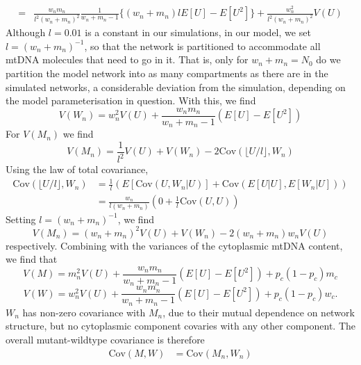 \documentclass{article}
\begin{document}
\begin{appendices}
{\begin{equation*}
\begin{split}
    =&\frac{w_nm_n}{l^2(w_n+m_n)^2}\frac{1}{w_n+m_n-1}\{(w_n+m_n)lE[U]-E[U^2]\}+\frac{w_n^2}{l^2(w_n+m_n)^2}V(U)
    \end{split}
\end{equation*}
Although $l=0.01$ is a constant in our simulations, in our model, we set $l=(w_n+m_n)^{-1}$, so that the network is partitioned to accommodate all mtDNA molecules that need to go in it. That is, only for $w_n+m_n=N_0$ do we partition the model network into as many compartments as there are in the simulated networks, a considerable deviation from the simulation, depending on the model parameterisation in question. With this, we find}
\begin{equation}
    V(W_n) = w_n^2V(U)+\frac{w_nm_n}{w_n+m_n-1}(E[U]-E[U^2])
\end{equation}
For $V(M_n)$ we find
\begin{equation*}
    V(M_n)=\frac{1}{l^2}V(U)+V(W_n)-2\mathrm{Cov}(\lfloor U/l \rfloor,W_n)
\end{equation*}
Using the law of total covariance,
\begin{equation*}
\begin{split}
    \mathrm{Cov}(\lfloor U/l \rfloor,W_n)
    &=\frac{1}{l}\left(E[\mathrm{Cov}(U,W_n|U)]+\mathrm{Cov}(E[U|U],E[W_n|U])\right)\\
    &=\frac{w_n}{l(w_n+m_n)}\left(0+\frac{1}{l}\mathrm{Cov}(U,U)\right)
\end{split}
\end{equation*}
Setting $l=(w_n+m_n)^{-1}$, we find
\begin{equation}
    V(M_n) = (w_n+m_n)^2V(U)+V(W_n)-2(w_n+m_n)w_nV(U)
\end{equation}
respectively. Combining with the variances of the cytoplasmic mtDNA content, we find that
\begin{equation}\label{eq:app-vm-repel}
V(M) = m_n^2V(U)+\frac{w_nm_n}{w_n+m_n-1}(E[U]-E[U^2])+p_c(1-p_c)m_c
\end{equation}
\begin{equation}\label{eq:app-vw-repel}
V(W) = w_n^2V(U)+\frac{w_nm_n}{w_n+m_n-1}(E[U]-E[U^2])+p_c(1-p_c)w_c.
\end{equation}
$W_n$ has non-zero covariance with $M_n$, due to their mutual dependence on network structure, but no cytoplasmic component covaries with any other component. The overall mutant-wildtype covariance is therefore
\begin{equation*}
\begin{split}
    \mathrm{Cov}(M,W) & =\mathrm{Cov}(M_n,W_n)\\

\end{split}
\end{equation*}
\end{appendices}
\end{document}
